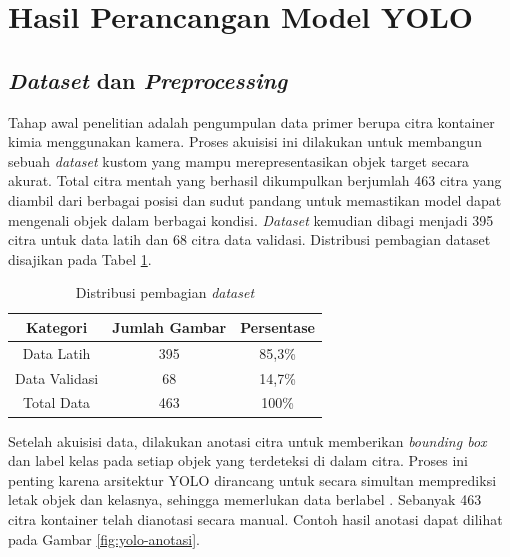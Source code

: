 \vspace{1em}

\section{Hasil Perancangan Model YOLO}
\subsection{\textit{Dataset} dan \textit{Preprocessing}}
Tahap awal penelitian adalah pengumpulan data primer berupa citra
kontainer kimia menggunakan kamera. Proses akuisisi ini dilakukan
untuk membangun  sebuah \textit{dataset} kustom yang mampu merepresentasikan
objek target secara akurat. Total citra mentah yang berhasil
dikumpulkan berjumlah 463 citra yang diambil dari berbagai posisi dan
sudut pandang untuk memastikan model dapat mengenali objek dalam
berbagai kondisi. \textit{Dataset} kemudian dibagi menjadi 395 citra
untuk data latih dan 68 citra data validasi. Distribusi pembagian dataset
disajikan pada Tabel \ref{tab:pembagian-dataset}.

\begin{table}[H]
  \caption{Distribusi pembagian \textit{dataset}}
  \label{tab:pembagian-dataset}
  \vspace{-1em}
  \centering
  \begin{tabular}{ccc}
    \toprule
    \textbf{Kategori} & \textbf{Jumlah Gambar} & \textbf{Persentase} \\
    \midrule
    Data Latih & 395 & 85,3\% \\
    Data Validasi & 68 & 14,7\% \\
    Total Data & 463 & 100\% \\
    \bottomrule
  \end{tabular}
\end{table}

Setelah akuisisi data, dilakukan anotasi citra untuk
memberikan \textit{bounding box} dan label kelas pada setiap objek yang
terdeteksi di dalam citra. Proses ini penting karena arsitektur YOLO
dirancang untuk secara simultan memprediksi letak objek dan kelasnya,
sehingga memerlukan data berlabel \citep{19,20}. Sebanyak 463 citra
kontainer telah dianotasi secara manual. Contoh hasil anotasi dapat
dilihat pada Gambar \ref{fig:yolo-anotasi}.


